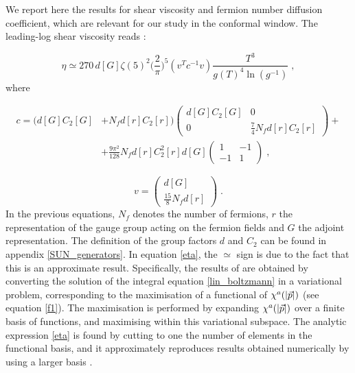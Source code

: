  We report here the results for shear viscosity and fermion number diffusion coefficient, which are relevant for our study in the conformal window. The leading-log shear viscosity reads \cite{Arnold:2000dr}:

 \begin{equation}   
\eta \simeq 270 \, d [G] \zeta(5)^2 \biggl( \frac{2}{\pi} \biggr)^5 (v^T c^{-1} v) \frac{T^3}{g(T)^4 \ln( g^{-1})}\;,
\label{eta}
\end{equation}
%
where  

\begin{equation}
\begin{split}
c =  (d [G] C_2 [G]  & + N_f d [r] C_2 [r])
\begin{pmatrix}
d [G] C_2 [G] & 0 \\
0 & \frac{7}{4} N_f d [r] C_2 [r]
\end{pmatrix}
+  \\
& + \frac{9 \pi^2}{128} N_f d [r] C_2^2 [r] d [G]
\begin{pmatrix}
1 & -1 \\
-1 & 1
\end{pmatrix} \;,
\end{split}
\end{equation}

\begin{equation}
v = 
\begin{pmatrix}
d [G] \\
\frac{15}{8} N_f d [r]
\end{pmatrix} \; .
\end{equation}
%
In the previous equations, $N_f$ denotes the number of fermions, $r$ the representation of the gauge group acting on the fermion fields and $G$ the adjoint representation. The definition of the group factors $d$ and $C_2$ can be found in appendix \ref{SUN_generators}. In equation \ref{eta}, the $\simeq$ sign is due to the fact that this is an approximate result. Specifically,  the results of \cite{Arnold:2000dr,Arnold:2003zc} are obtained by converting the solution of the integral equation \ref{lin_boltzmann} in a variational problem, corresponding to the maximisation of a functional of $\chi^a(\abs{\vec p})$ (see equation \ref{f1}). The maximisation is performed by expanding $\chi^a(\abs{\vec p})$ over a finite basis of functions, and maximising within this variational subspace. The analytic expression \ref{eta} is found by cutting to one the number of elements in the functional basis, and it approximately reproduces results obtained numerically by using a larger basis \cite{Arnold:2000dr}.


